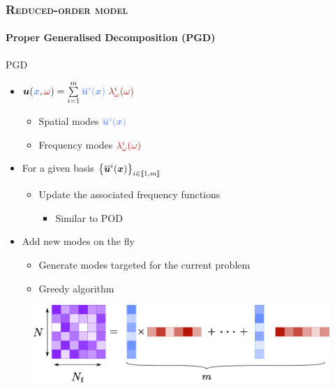 \documentclass[aspectratio=1610]{beamer}
\begin{document}
	\begin{frame}
		\frametitle{\textsc{Reduced-order model}}
		\framesubtitle{Proper Generalised Decomposition (PGD)}		
		
		\begin{minipage}{0.53\linewidth}
			\begin{greenblockshadow}{PGD}
				\vspace*{8pt}
				\begin{itemize}
					\item  $\vect{u}(\textcolor{LightBleuLMPS}{\vect{x}},\textcolor{RougeCEA}{\omega}) = \sum\limits_{i=1}^m \textcolor{LightBleuLMPS}{\overline{\vect{u}}^i(\vect{x})} ~\textcolor{RougeCEA}{\lambda^i_{\omega}(\omega)}$
					\begin{itemize}
						\item Spatial modes $\textcolor{LightBleuLMPS}{\overline{\vect{u}}^i(\vect{x})}$
						\item Frequency modes $\textcolor{RougeCEA}{\lambda^i_{\omega}(\omega)}$
					\end{itemize}
					\item For a given basis {\footnotesize$\left\{\overline{\boldsymbol{u}}^i(\boldsymbol{x})\right\}_{i \in \llbracket 1,m\rrbracket}$}
					\begin{itemize}
						\item Update the associated frequency functions
						\begin{itemize}
							\item Similar to POD
						\end{itemize}
					\end{itemize}
					\item Add new modes on the fly
					\begin{itemize}
						\item Generate modes targeted for the current problem
						\item Greedy algorithm
					\end{itemize}
					\vspace*{8pt}
				\end{itemize}
			\end{greenblockshadow}
		\end{minipage}
		\hfill
		\begin{minipage}{0.45\linewidth}
			\vspace{38pt}
			\begin{figure}
				\centering
				\includegraphics[width=\linewidth]{Figures/PGD_Method_Matrix_2.eps}

\end{figure}
\end{minipage}
\end{frame}
\end{document}
